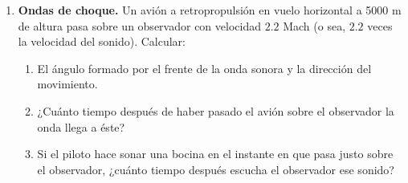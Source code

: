 \documentclass[11pt,spanish,a4paper]{article}
\begin{document}
\begin{enumerate}
\item \textbf{Ondas de choque.} Un avión a retropropulsión en vuelo horizontal
a 5000 m de altura pasa sobre un observador con velocidad $2.2$ Mach
(o sea, $2.2$ veces la velocidad del sonido). Calcular:

\begin{enumerate}
\item El ángulo formado por el frente de la onda sonora y la dirección del
movimiento.
\item ¿Cuánto tiempo después de haber pasado el avión sobre el observador
la onda llega a éste?
\item Si el piloto hace sonar una bocina en el instante en que pasa justo
sobre el observador, ¿cuánto tiempo después escucha el observador
ese sonido?
\end{enumerate}



\end{enumerate}
\end{document}
